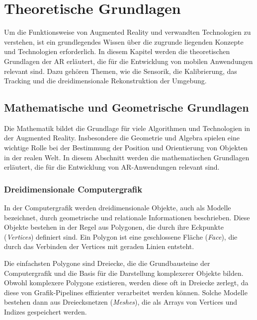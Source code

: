 \chapter{Theoretische Grundlagen}

Um die Funktionsweise von Augmented Reality und verwandten Technologien zu verstehen, ist ein grundlegendes Wissen über die zugrunde liegenden Konzepte und Technologien erforderlich. In diesem Kapitel werden die theoretischen Grundlagen der AR erläutert, die für die Entwicklung von mobilen Anwendungen relevant sind. Dazu gehören Themen, wie die Sensorik, die Kalibrierung, das Tracking und die dreidimensionale Rekonstruktion der Umgebung. \cite{doerner2022virtual}

\section{Mathematische und Geometrische Grundlagen}

Die Mathematik bildet die Grundlage für viele Algorithmen und Technologien in der Augmented Reality. Insbesondere die Geometrie und Algebra spielen eine wichtige Rolle bei der Bestimmung der Position und Orientierung von Objekten in der realen Welt. In diesem Abschnitt werden die mathematischen Grundlagen erläutert, die für die Entwicklung von AR-Anwendungen relevant sind.

\subsection{Dreidimensionale Computergrafik}

In der Computergrafik werden dreidimensionale Objekte, auch als Modelle bezeichnet, durch geometrische und relationale Informationen beschrieben. Diese Objekte bestehen in der Regel aus Polygonen, die durch ihre Eckpunkte (\emph{Vertices}) definiert sind. Ein Polygon ist eine geschlossene Fläche (\emph{Face}), die durch das Verbinden der Vertices mit geraden Linien entsteht. \cite{wikipedia2023polygons, espinoza2024graphics}

Die einfachsten Polygone sind Dreiecke, die die Grundbausteine der Computergrafik und die Basis für die Darstellung komplexerer Objekte bilden. Obwohl komplexere Polygone existieren, werden diese oft in Dreiecke zerlegt, da diese von Grafik-Pipelines effizienter verarbeitet werden können. Solche Modelle bestehen dann aus Dreiecksnetzen (\emph{Meshes}), die als Arrays von Vertices und Indizes gespeichert werden. \cite{wikipedia2023polygons, espinoza2024graphics}

